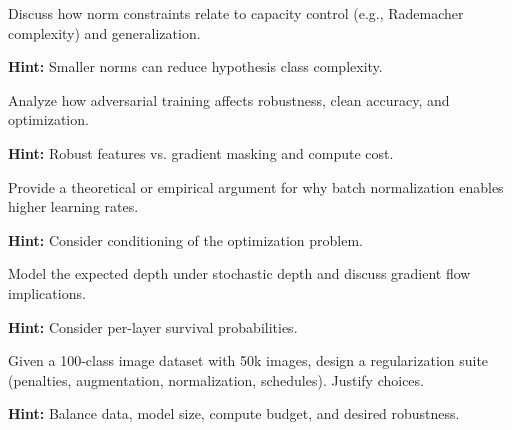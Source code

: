 \begin{problem}
Discuss how norm constraints relate to capacity control (e.g., Rademacher complexity) and generalization.

\textbf{Hint:} Smaller norms can reduce hypothesis class complexity.
\end{problem}

\begin{problem}
Analyze how adversarial training affects robustness, clean accuracy, and optimization.

\textbf{Hint:} Robust features vs. gradient masking and compute cost.
\end{problem}

\begin{problem}
Provide a theoretical or empirical argument for why batch normalization enables higher learning rates.

\textbf{Hint:} Consider conditioning of the optimization problem.
\end{problem}

\begin{problem}
Model the expected depth under stochastic depth and discuss gradient flow implications.

\textbf{Hint:} Consider per-layer survival probabilities.
\end{problem}

\begin{problem}
Given a 100-class image dataset with 50k images, design a regularization suite (penalties, augmentation, normalization, schedules). Justify choices.

\textbf{Hint:} Balance data, model size, compute budget, and desired robustness.
\end{problem}



